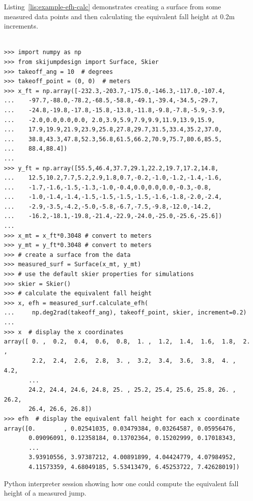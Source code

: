\documentclass{article}
\begin{document}
Listing~\ref{lis:example-efh-calc} demonstrates creating a surface from some
measured data points and then calculating the equivalent fall height at
0.2\si{\meter} increments.
%
\begin{listing*}
  \begin{verbatim}

>>> import numpy as np
>>> from skijumpdesign import Surface, Skier
>>> takeoff_ang = 10  # degrees
>>> takeoff_point = (0, 0)  # meters
>>> x_ft = np.array([-232.3,-203.7,-175.0,-146.3,-117.0,-107.4,
...    -97.7,-88.0,-78.2,-68.5,-58.8,-49.1,-39.4,-34.5,-29.7,
...    -24.8,-19.8,-17.8,-15.8,-13.8,-11.8,-9.8,-7.8,-5.9,-3.9,
...    -2.0,0.0,0.0,0.0, 2.0,3.9,5.9,7.9,9.9,11.9,13.9,15.9,
...    17.9,19.9,21.9,23.9,25.8,27.8,29.7,31.5,33.4,35.2,37.0,
...    38.8,43.3,47.8,52.3,56.8,61.5,66.2,70.9,75.7,80.6,85.5,
...    88.4,88.4])
...
>>> y_ft = np.array([55.5,46.4,37.7,29.1,22.2,19.7,17.2,14.8,
...    12.5,10.2,7.7,5.2,2.9,1.8,0.7,-0.2,-1.0,-1.2,-1.4,-1.6,
...    -1.7,-1.6,-1.5,-1.3,-1.0,-0.4,0.0,0.0,0.0,-0.3,-0.8,
...    -1.0,-1.4,-1.4,-1.5,-1.5,-1.5,-1.5,-1.6,-1.8,-2.0,-2.4,
...    -2.9,-3.5,-4.2,-5.0,-5.8,-6.7,-7.5,-9.8,-12.0,-14.2,
...    -16.2,-18.1,-19.8,-21.4,-22.9,-24.0,-25.0,-25.6,-25.6])
...
>>> x_mt = x_ft*0.3048 # convert to meters
>>> y_mt = y_ft*0.3048 # convert to meters
>>> # create a surface from the data
>>> measured_surf = Surface(x_mt, y_mt)
>>> # use the default skier properties for simulations
>>> skier = Skier()
>>> # calculate the equivalent fall height
>>> x, efh = measured_surf.calculate_efh(
...     np.deg2rad(takeoff_ang), takeoff_point, skier, increment=0.2)
...
>>> x  # display the x coordinates
array([ 0. ,  0.2,  0.4,  0.6,  0.8,  1. ,  1.2,  1.4,  1.6,  1.8,  2. ,
        2.2,  2.4,  2.6,  2.8,  3. ,  3.2,  3.4,  3.6,  3.8,  4. ,  4.2,
       ...
       24.2, 24.4, 24.6, 24.8, 25. , 25.2, 25.4, 25.6, 25.8, 26. , 26.2,
       26.4, 26.6, 26.8])
>>> efh  # display the equivalent fall height for each x coordinate
array([0.        , 0.02541035, 0.03479384, 0.03264587, 0.05956476,
       0.09096091, 0.12358184, 0.13702364, 0.15202999, 0.17018343,
       ...
       3.93910556, 3.97387212, 4.00891899, 4.04424779, 4.07984952,
       4.11573359, 4.68049185, 5.53413479, 6.45253722, 7.42628019])
  \end{verbatim}
  \caption{Python interpreter session showing how one could compute the
  equivalent fall height of a measured jump.}
  \label{lis:example-efh-calc}
\end{listing*}
\end{document}
